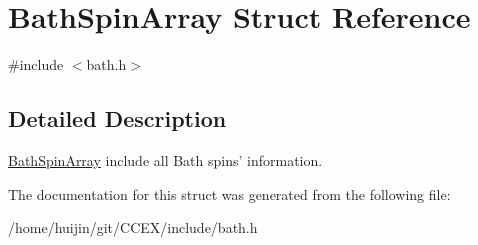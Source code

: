 \hypertarget{structBathSpinArray}{\section{Bath\-Spin\-Array Struct Reference}
\label{structBathSpinArray}
}


{\ttfamily \#include $<$bath.\-h$>$}



\subsection{Detailed Description}
\hyperlink{structBathSpinArray}{Bath\-Spin\-Array} include all Bath spins' information. 

The documentation for this struct was generated from the following file\-:\begin{DoxyCompactItemize}
\item 
/home/huijin/git/\-C\-C\-E\-X/include/bath.\-h\end{DoxyCompactItemize}
